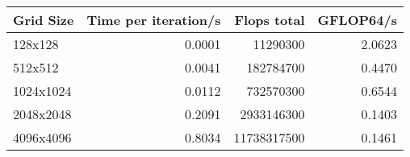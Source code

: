 \begin{tabular}{lrrr}
\toprule
 Grid Size &  Time per iteration/s &  Flops total &  GFLOP64/s \\
\midrule
   128x128 &                0.0001 &     11290300 &     2.0623 \\
   512x512 &                0.0041 &    182784700 &     0.4470 \\
 1024x1024 &                0.0112 &    732570300 &     0.6544 \\
 2048x2048 &                0.2091 &   2933146300 &     0.1403 \\
 4096x4096 &                0.8034 &  11738317500 &     0.1461 \\
\bottomrule
\end{tabular}

